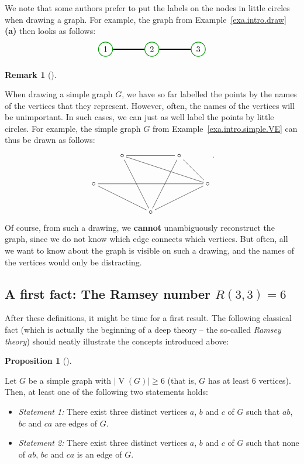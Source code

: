 \documentclass[numbers=enddot,12pt,final,onecolumn,notitlepage]{scrartcl}%
\makeatletter
\theoremstyle{definition}
\newtheorem{prop}[theo]{Proposition}
\newenvironment{proposition}[1][]
{\begin{prop}[#1]\begin{leftbar}}
{\end{leftbar}\end{prop}}
\newtheorem{remk}[theo]{Remark}
\newenvironment{remark}[1][]
{\begin{remk}[#1]\begin{leftbar}}
{\end{leftbar}\end{remk}}
\newcommand{\abs}[1]{\left| #1 \right|}
\newcommand{\tup}[1]{\left( #1 \right)}
\newcommand{\verts}[1]{\operatorname{V}\left( #1 \right)}
\newcommand{\are}{\ar@{-}}
\makeatother
\begin{document}
We note that some authors prefer to put the labels on the nodes
in little circles when drawing a graph. For example, the graph
from Example~\ref{exa.intro.draw} \textbf{(a)} then looks as
follows:
\[
\begin{tikzpicture}
\begin{scope}[every node/.style={circle,thick,draw=green!60!black}]
\node(A) at (0,0) {$1$};
\node(B) at (2,0) {$2$};
\node(C) at (4,0) {$3$};
\end{scope}
\begin{scope}[every edge/.style={draw=black,very thick}]
\path[-] (B) edge (A) (B) edge (C);
\end{scope}
\end{tikzpicture}
\]

\begin{remark}
When drawing a simple graph $G$, we have so far labelled the points
by the names of the vertices that they represent. However, often, the
names of the vertices will be unimportant. In such cases, we can just
as well label the points by little circles. For example, the simple
graph $G$ from Example~\ref{exa.intro.simple.VE} can thus be drawn
as follows:
\begin{align*}
\xymatrix{
& \circ \are[rr] \are[rrrd] \are[rdd] & & \circ \are[rd] \are[ldd] \\
\circ \are[rrrr] \are[rrd] & & & & \circ \are[lld] \\
& & \circ
} .
\end{align*}
Of course, from such a drawing, we \textbf{cannot} unambiguously
reconstruct the graph, since we do not know which edge connects which
vertices. But often, all we want to know about the graph is visible on
such a drawing, and the names of the vertices would only be
distracting.
\end{remark}

\subsection{\label{sect.intro.R33}A first fact: The Ramsey number
$R\tup{3,3} = 6$}

After these definitions, it might be time for a first result. The
following classical fact (which is actually the beginning of a deep
theory -- the so-called \textit{Ramsey theory}) should neatly
illustrate the concepts introduced above:

\begin{proposition} \label{prop.simple.R33}
Let $G$ be a simple graph with $\abs{\verts{G}} \geq 6$ (that is,
$G$ has at least $6$ vertices). Then, at least one of the following
two statements holds:

\begin{itemize}
\item \textit{Statement 1:} There exist three distinct vertices $a$,
$b$ and $c$ of $G$ such that $ab$, $bc$ and $ca$ are edges of $G$.

\item \textit{Statement 2:} There exist three distinct vertices $a$,
$b$ and $c$ of $G$ such that none of $ab$, $bc$ and $ca$ is an edge of
$G$.
\end{itemize}
\end{proposition}
\end{document}

